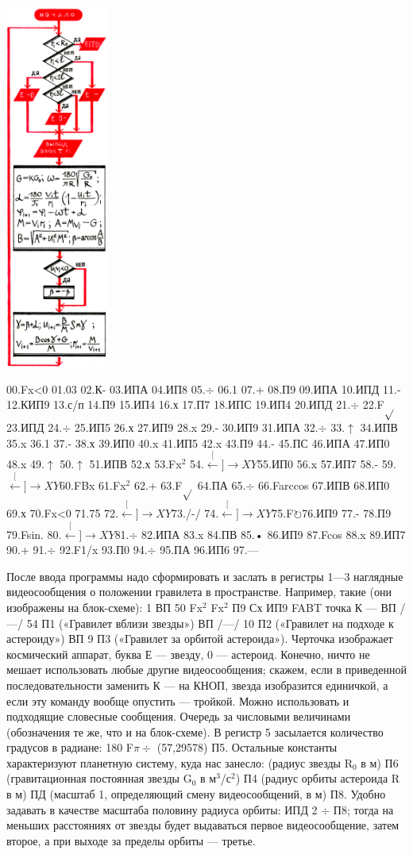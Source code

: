 \documentclass[11pt,a4paper,oneside]{article}
\def\XY{$\stackrel[\leftarrow]{\rightarrow}{XY}$}
\def\FO{F$\circlearrowright$}
\begin{document}
\includegraphics[width=0.25\textwidth]{pulsar_algo}

00.Fx<0 01.03 02.К- 03.ИПА 04.ИП8 05.$\div$ 06.1 07.+
08.П9 09.ИПА 10.ИПД 11.- 12.КИП9 13.с/п 14.П9 15.ИП4 16.х 17.П7 18.ИПС 19.ИП4 20.ИПД 21.$\div$ 22.F$\sqrt{}$ 23.ИПД
24.$\div$ 25.ИП5 26.х 27.ИП9 28.x 29.- 30.ИП9 31.ИПА
32.$\div$ 33.$\uparrow$ 34.ИПВ 35.x 36.1 37.- 38.х 39.ИП0 40.x 41.ИП5 42.x 43.П9 44.- 45.ПС 46.ИПА 47.ИП0 48.x 49.$\uparrow$ 50.$\uparrow$
51.ИПВ 52.х 53.Fx$^{2}$ 54.\XY 55.ИП0 56.x 57.ИП7 58.- 59.\XY 60.FBx 61.Fx$^{2}$ 62.+ 63.F$\sqrt{}$ 64.ПА 65.$\div$ 66.Farccos 67.ИПВ 68.ИП0 69.х 70.Fx<0 71.75 72.\XY 73./-/ 74.\XY 75.\FO 76.ИП9 77.- 78.П9 79.Fsin. 80.\XY 81.$\div$ 82.ИПА 83.x 84.ПВ 85.• 86.ИП9 87.Fcos 88.x 89.ИП7 90.+ 91.$\div$ 92.F1/x 93.П0 94.$\div$ 95.ПА 96.ИП6 97.—

После ввода программы надо сформировать и заслать в регистры 1—3 наглядные видеосообщения о положении гравилета в пространстве. Например, такие (они изображены на блок-схеме): 1 ВП 50 Fx$^{2}$ Fx$^{2}$ П9 Сх ИП9 FABT точка К — ВП /—/ 54 П1 («Гравилет вблизи звезды») ВП /—/ 10 П2 («Гравилет на подходе к астероиду») ВП 9 П3 («Гравилет за орбитой астероида»). Черточка изображает космический аппарат, буква Е — звезду, 0 — астероид. Конечно, ничто не мешает использовать любые другие видеосообщения; скажем, если в приведенной последовательности заменить К — на КНОП, звезда изобразится единичкой, а если эту команду вообще опустить — тройкой. Можно использовать и подходящие словесные сообщения.
Очередь за числовыми величинами (обозначения те же, что и на блок-схеме). В регистр 5 засылается количество градусов в радиане: 180 F$\pi\div$ (57,29578) П5. Остальные константы характеризуют планетную систему, куда нас занесло: (радиус звезды R$_{0}$ в м) П6 (гравитационная постоянная звезды G$_{0}$ в м$^{3}$/с$^{2}$) П4 (радиус орбиты астероида R в м) ПД (масштаб 1, определяющий смену видеосообщений, в м) П8. Удобно задавать в качестве масштаба половину радиуса орбиты: ИПД 2 $\div$ П8; тогда на меньших расстояниях от звезды будет выдаваться первое видеосообщение, затем второе, а при выходе за пределы орбиты — третье.
\end{document}

